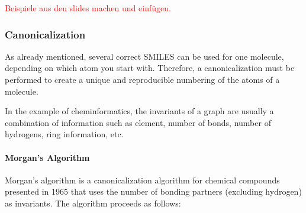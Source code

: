 \textcolor{red}{Beispiele aus den slides machen und einfügen.}

%

\subsubsection{Canonicalization}

As already mentioned, several correct SMILES can be used for one molecule, depending on which atom you start with. Therefore, a canonicalization must be performed to create a unique and reproducible numbering of the atoms of a molecule.



In the example of cheminformatics, the invariants of a graph are usually a combination of information such as element, number of bonds, number of hydrogens, ring information, etc.

\paragraph{Morgan's Algorithm}
Morgan's algorithm is a canonicalization algorithm for chemical compounds presented in 1965 that uses the number of bonding partners (excluding hydrogen) as invariants. The algorithm proceeds as follows:

